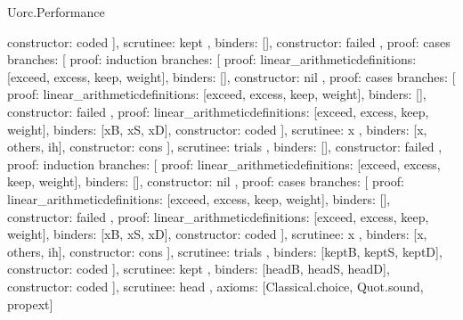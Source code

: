 \begin{lexlean}{Uorc.Performance}
\begin{semanticmodule}
{{{{{              constructor: coded
            }
          ],
          scrutinee: kept
        },
        binders: [],
        constructor: failed
      },
      {
        proof: cases{
          branches: [
            {
              proof: induction{
                branches: [
                  {
                    proof: linear_arithmetic{definitions: [exceed, excess, keep, weight]},
                    binders: [],
                    constructor: nil
                  },
                  {
                    proof: cases{
                      branches: [
                        {
                          proof: linear_arithmetic{definitions: [exceed, excess, keep, weight]},
                          binders: [],
                          constructor: failed
                        },
                        {
                          proof: linear_arithmetic{definitions: [exceed, excess, keep, weight]},
                          binders: [xB, xS, xD],
                          constructor: coded
                        }
                      ],
                      scrutinee: x
                    },
                    binders: [x, others, ih],
                    constructor: cons
                  }
                ],
                scrutinee: trials
              },
              binders: [],
              constructor: failed
            },
            {
              proof: induction{
                branches: [
                  {
                    proof: linear_arithmetic{definitions: [exceed, excess, keep, weight]},
                    binders: [],
                    constructor: nil
                  },
                  {
                    proof: cases{
                      branches: [
                        {
                          proof: linear_arithmetic{definitions: [exceed, excess, keep, weight]},
                          binders: [],
                          constructor: failed
                        },
                        {
                          proof: linear_arithmetic{definitions: [exceed, excess, keep, weight]},
                          binders: [xB, xS, xD],
                          constructor: coded
                        }
                      ],
                      scrutinee: x
                    },
                    binders: [x, others, ih],
                    constructor: cons
                  }
                ],
                scrutinee: trials
              },
              binders: [keptB, keptS, keptD],
              constructor: coded
            }
          ],
          scrutinee: kept
        },
        binders: [headB, headS, headD],
        constructor: coded
      }
    ],
    scrutinee: head
  },
  axioms: [Classical.choice, Quot.sound, propext]
}


\end{semanticmodule}
\end{lexlean}
